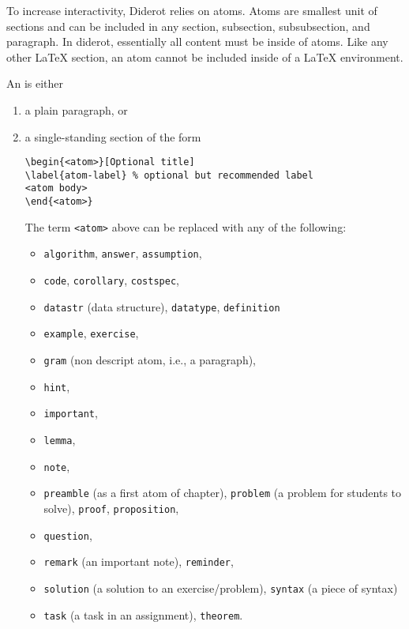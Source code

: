 \begin{definition}[Atom]
To increase interactivity, Diderot relies on atoms.
%
Atoms are smallest unit of sections and can be included in any section, subsection, subsubsection, and paragraph.
%
In diderot, essentially all content  must be inside of atoms.
%
Like any other LaTeX section, an atom cannot be included inside of a
LaTeX environment.
%

An  is either
\begin{enumerate}
\item a plain paragraph, or
\item a single-standing section of the form

\begin{lstlisting}
\begin{<atom>}[Optional title]
\label{atom-label} % optional but recommended label
<atom body>
\end{<atom>}
\end{lstlisting}
%
The term \lstinline`<atom>` above can be replaced with any of the following:
\begin{itemize}
\item \lstinline`algorithm`, \lstinline`answer`, \lstinline`assumption`,
\item \lstinline`code`, \lstinline`corollary`, \lstinline`costspec`,
\item \lstinline`datastr` (data structure), \lstinline`datatype`, \lstinline`definition`
\item \lstinline`example`, \lstinline`exercise`,
\item \lstinline`gram`  (non descript atom, i.e., a paragraph),
\item \lstinline`hint`, 
\item \lstinline`important`, 
\item \lstinline`lemma`,
\item \lstinline`note`,
\item \lstinline`preamble` (as a  first atom of chapter), \lstinline`problem` (a problem for students to solve), \lstinline`proof`, \lstinline`proposition`,
\item \lstinline`question`,
\item \lstinline`remark` (an important note), \lstinline`reminder`,
\item \lstinline`solution` (a solution to an exercise/problem), \lstinline`syntax` (a piece of syntax)
\item \lstinline`task` (a task in an assignment), \lstinline`theorem`.
\end{itemize}
\end{enumerate}

\end{definition}

